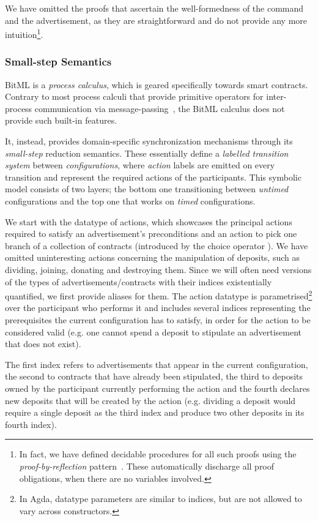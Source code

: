 \documentclass[acmsmall,nonacm=true,screen=true]{acmart}
\begin{document}
We have omitted the proofs that ascertain the well-formedness of the \inlinePut{} command and the advertisement, as
they are straightforward and do not provide any more intuition\footnote{
In fact, we have defined decidable procedures for all such proofs using the
\textit{proof-by-reflection} pattern~\cite{proofbyreflection}.
These automatically discharge all proof obligations, when there are no variables involved.}.

\subsubsection{Small-step Semantics}
BitML is a \textit{process calculus}, which is geared specifically towards smart contracts.
Contrary to most process calculi that provide primitive operators for inter-process communication via
message-passing~\cite{csp}, the BitML calculus does not provide such built-in features.

It, instead, provides domain-specific synchronization mechanisms through its \textit{small-step} reduction semantics.
These essentially define a \textit{labelled transition system} between \textit{configurations}, where
\textit{action} labels are emitted on every transition and represent the required actions of the participants.
This symbolic model consists of two layers; the bottom one transitioning between \textit{untimed} configurations and the top one
that works on \textit{timed} configurations.

We start with the datatype of actions, which showcases the principal actions required to satisfy an advertisement's preconditions
and an action to pick one branch of a collection of contracts (introduced by the choice operator \inlineOplus{}).
We have omitted uninteresting actions concerning the manipulation of deposits, such as dividing, joining, donating and destroying them.
Since we will often need versions of the types of advertisements/contracts with their
indices existentially quantified, we first provide aliases for them.
\BITactionsA{}
\BITactionsB{}
The action datatype is parametrised\footnote{
In Agda, datatype parameters are similar to indices, but are not allowed to vary across constructors.
}
over the participant who performs it
and includes several indices representing the prerequisites the current configuration has to satisfy, in order for
the action to be considered valid (e.g. one cannot spend a deposit to stipulate an advertisement that does not exist).

The first index refers to advertisements that appear in the current configuration, the second to contracts that have
already been stipulated, the third to deposits owned by the participant currently performing the action and the fourth
declares new deposits that will be created by the action
(e.g. dividing a deposit would require a single deposit as the third index and produce two other deposits in its fourth index).
\end{document}
